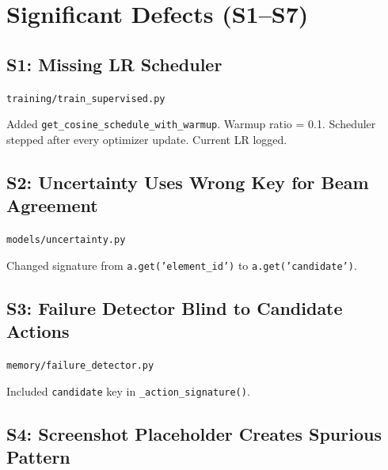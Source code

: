 \documentclass[11pt,a4paper]{article}
\begin{document}
\section{Significant Defects (S1--S7)}

\subsection{S1: Missing LR Scheduler}

\begin{description}[leftmargin=2cm,style=nextline]
\item[File] \texttt{training/train\_supervised.py}
\item[Fix]
  Added \texttt{get\_cosine\_schedule\_with\_warmup}. Warmup ratio = 0.1.
  Scheduler stepped after every optimizer update. Current LR logged.
\end{description}

\subsection{S2: Uncertainty Uses Wrong Key for Beam Agreement}

\begin{description}[leftmargin=2cm,style=nextline]
\item[File] \texttt{models/uncertainty.py}
\item[Fix]
  Changed signature from \texttt{a.get('element\_id')} to
  \texttt{a.get('candidate')}.
\end{description}

\subsection{S3: Failure Detector Blind to Candidate Actions}

\begin{description}[leftmargin=2cm,style=nextline]
\item[File] \texttt{memory/failure\_detector.py}
\item[Fix]
  Included \texttt{candidate} key in \texttt{\_action\_signature()}.
\end{description}

\subsection{S4: Screenshot Placeholder Creates Spurious Pattern}
\end{document}
